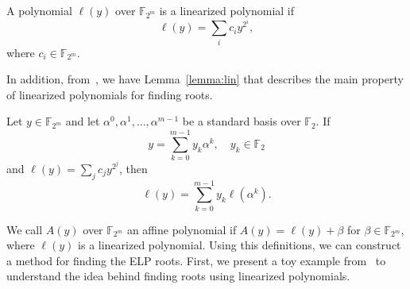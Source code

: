 \begin{definition}
A polynomial $\ell(y)$ over $\mathbb{F}_{2^m}$ is a linearized polynomial if
\begin{equation}
    \ell(y) = \sum_i c_iy^{2^i},
\end{equation}
where $c_i \in \mathbb{F}_{2^m}$.
\end{definition}
In addition, from~\cite{truong2001fast}, we have Lemma~\ref{lemma:lin} that describes the main property of linearized polynomials for finding roots.
\begin{lemma}
\label{lemma:lin}
    Let $y \in \mathbb{F}_{2^m}$ and let $\alpha^0, \alpha^1, \ldots, \alpha^{m-1}$ be a standard basis over $\mathbb{F}_2$. If
    \begin{equation}
        y = \sum_{k=0}^{m-1} y_k\alpha^k,\quad y_k \in \mathbb{F}_2
    \end{equation}
    and $\ell(y) =\sum_j c_jy^{2^j}$, then
      \begin{equation}
        \ell(y) = \sum_{k=0}^{m-1} y_k\ell(\alpha^k).
    \end{equation}
\end{lemma}

We call $A(y)$ over $\mathbb{F}_{2^m}$ an affine polynomial if $A(y) = \ell(y) + \beta$ for $\beta \in \mathbb{F}_{2^m}$, where $\ell(y)$ is a linearized polynomial. Using this definitions, we can construct a method for finding the ELP roots. First, we present a toy example from~\cite{truong2001fast} to understand the idea behind finding roots using linearized polynomials.

